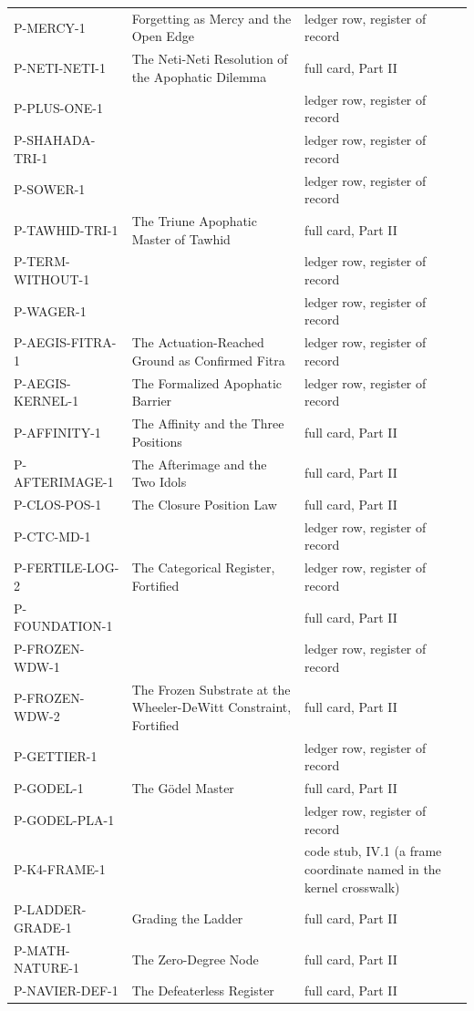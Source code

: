 \documentclass[10pt,twocolumn]{article}
\begin{document}
\begin{center}
\begin{longtable}{>{\raggedright\arraybackslash}p{}>{\raggedright\arraybackslash}p{}>{\raggedright\arraybackslash}p{}}
P-MERCY-1 & Forgetting as Mercy and the Open Edge & ledger row, register of record \\
P-NETI-NETI-1 & The Neti-Neti Resolution of the Apophatic Dilemma & full card, Part II \\
P-PLUS-ONE-1 &  & ledger row, register of record \\
P-SHAHADA-TRI-1 &  & ledger row, register of record \\
P-SOWER-1 &  & ledger row, register of record \\
P-TAWHID-TRI-1 & The Triune Apophatic Master of Tawhid & full card, Part II \\
P-TERM-WITHOUT-1 &  & ledger row, register of record \\
P-WAGER-1 &  & ledger row, register of record \\
P-AEGIS-FITRA-1 & The Actuation-Reached Ground as Confirmed Fitra & ledger row, register of record \\
P-AEGIS-KERNEL-1 & The Formalized Apophatic Barrier & ledger row, register of record \\
P-AFFINITY-1 & The Affinity and the Three Positions & full card, Part II \\
P-AFTERIMAGE-1 & The Afterimage and the Two Idols & full card, Part II \\
P-CLOS-POS-1 & The Closure Position Law & full card, Part II \\
P-CTC-MD-1 &  & ledger row, register of record \\
P-FERTILE-LOG-2 & The Categorical Register, Fortified & ledger row, register of record \\
P-FOUNDATION-1 &  & full card, Part II \\
P-FROZEN-WDW-1 &  & ledger row, register of record \\
P-FROZEN-WDW-2 & The Frozen Substrate at the Wheeler-DeWitt Constraint, Fortified & full card, Part II \\
P-GETTIER-1 &  & ledger row, register of record \\
P-GODEL-1 & The Gödel Master & full card, Part II \\
P-GODEL-PLA-1 &  & ledger row, register of record \\
P-K4-FRAME-1 &  & code stub, IV.1 (a frame coordinate named in the kernel crosswalk) \\
P-LADDER-GRADE-1 & Grading the Ladder & full card, Part II \\
P-MATH-NATURE-1 & The Zero-Degree Node & full card, Part II \\
P-NAVIER-DEF-1 & The Defeaterless Register & full card, Part II \\

\end{longtable}
\end{center}
\end{document}
